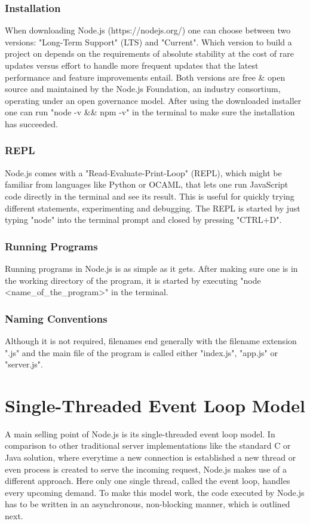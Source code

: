\documentclass{bioinfo}
\begin{document}
\subsubsection{Installation}
When downloading Node.js (https://nodejs.org/) one can choose between two versions: "Long-Term Support" (LTS) and "Current". Which version to build a project on depends on the requirements of absolute stability at the cost of rare updates versus effort to handle more frequent updates that the latest performance and feature improvements entail.
Both versions are free \& open source and maintained by the Node.js Foundation, an industry consortium, operating under an open governance model. After using the downloaded installer one can run "node -v \&\& npm -v" in the terminal to make sure the installation has succeeded.

\subsubsection{REPL}
Node.js comes with a "Read-Evaluate-Print-Loop" (REPL), which might be familiar from languages like Python or OCAML, that lets one run JavaScript code directly in the terminal and see its result. This is useful for quickly trying different statements, experimenting and debugging. The REPL is started by just typing "node" into the terminal prompt and closed by pressing "CTRL+D".

\subsubsection{Running Programs}
Running programs in Node.js is as simple as it gets. After making sure one is in the working directory of the program, it is started by executing "node <name\_of\_the\_program>" in the terminal.

\subsubsection{Naming Conventions}
Although it is not required, filenames end generally with the filename extension ".js" and the main file of the program is called either "index.js", "app.js" or "server.js".

\section{Single-Threaded Event Loop Model}

A main selling point of Node.js is its single-threaded event loop model. In comparison to other traditional server implementations like the standard C or Java solution, where everytime a new connection is established a new thread or even process is created to serve the incoming request, Node.js makes use of a different approach. Here only one single thread, called the event loop, handles every upcoming demand. To make this model work, the code executed by Node.js has to be written in an asynchronous, non-blocking manner, which is outlined next.
\end{document}
